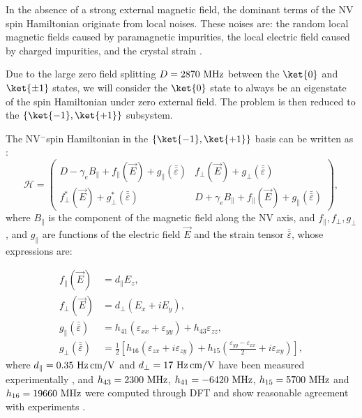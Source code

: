 \documentclass[a4paper, 11pt]{report}
\begin{document}
In the absence of a strong external magnetic field, the dominant terms of the NV spin Hamiltonian originate from local noises. These noises are: the random local magnetic fields caused by paramagnetic impurities, the local electric field caused by charged impurities, and the crystal strain \citep{doherty2012theory, udvarhelyi2018spin, mittiga2018imaging}. 

Due to the large zero field splitting $D=2870\ \rm MHz$ between the $\ket{0}$ and $\ket{\pm 1}$ states, we will consider the $\ket{0}$ state to always be an eigenstate of the spin Hamiltonian under zero external field. The problem is then reduced to the $\{ \ket{-1}, \ket{+1} \}$ subsystem.

The NV$^-$spin Hamiltonian in the $\{ \ket{-1}, \ket{+1} \}$ basis can be written as \citep{udvarhelyi2018spin}:
\begin{equation}
\mathcal{H}=\begin{pmatrix}
D-\gamma_e B_\parallel + f_\parallel(\vec{E}) + g_\parallel(\bar{\bar{\varepsilon}}) & f_\perp(\vec{E}) + g_\perp(\bar{\bar{\varepsilon}})\\
f^*_\perp(\vec{E}) + g^*_\perp(\bar{\bar{\varepsilon}})&D+\gamma_e B_\parallel + f_\parallel(\vec{E}) + g_\parallel(\bar{\bar{\varepsilon}})
\end{pmatrix},
\label{Hamiltonien pm1}
\end{equation}
where $B_\parallel$ is the component of the magnetic field along the NV axis, and $f_\parallel, f_\perp, g_\perp$, and $g_\parallel$ are functions of the electric field $\vec{E}$ and the strain tensor $\bar{\bar{\varepsilon}}$, whose expressions are:

\begin{align}
f_\parallel(\vec{E})&=d_\parallel E_z, \\
f_\perp(\vec{E})&=d_\perp ( E_x + i E_y), \\
g_\parallel(\bar{\bar{\varepsilon}})&= h_{41}(\varepsilon_{xx}+\varepsilon_{yy})+h_{43} \varepsilon_{zz}, \\
g_\perp(\bar{\bar{\varepsilon}}) &= \frac{1}{2} \left[ h_{16}(\varepsilon_{zx}+i \varepsilon_{zy}) + h_{15}\left(\frac{\varepsilon_{yy}-\varepsilon_{xx}}{2}+i\varepsilon_{xy}\right) \right],
\end{align}
where $d_\parallel=0.35 \ \rm{Hz\, cm/V}$ and $d_\perp=17\ \rm{Hz\, cm/V}$ have been measured experimentally \citep{van1990electric}, and $h_{43}=2300\ \rm{MHz}$, $h_{41}=-6420\ \rm{MHz}$, $h_{15}=5700\ \rm{MHz}$ and $h_{16}=19660\ \rm{MHz}$ were computed through DFT \citep{udvarhelyi2018spin} and show reasonable agreement with experiments \citep{barson2017nanomechanical}.
\end{document}
